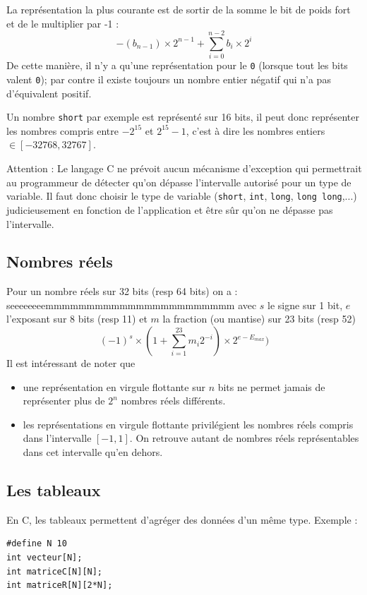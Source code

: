 La représentation la plus courante est de sortir de la somme le bit de poids fort et de le multiplier par -1 :
$$ -(b_{n-1}) \times 2^{n-1} +  \sum_{i=0}^{n-2} b_i \times 2^i$$
De cette manière, il n'y a qu'une représentation pour le \texttt{0} (lorsque tout les bits valent \texttt{0}); par contre il existe toujours un nombre entier négatif qui n'a pas d'équivalent positif.

Un nombre \texttt{short} par exemple est représenté sur 16 bits, il peut donc représenter les nombres compris entre $-2^{15}$ et $2^{15} - 1$, c'est à dire les nombres entiers $\in [-32768, 32767]$.


Attention : Le langage C ne prévoit aucun mécanisme d'exception qui permettrait au programmeur de détecter qu'on dépasse l'intervalle autorisé pour un type de variable.
Il faut donc choisir le type de variable (\texttt{short}, \texttt{int}, \texttt{long}, \texttt{long long},...) judicieusement en fonction de l'application et être sûr qu'on ne dépasse pas l'intervalle.

\subsection{Nombres réels}
Pour un nombre réels sur 32 bits (resp 64 bits) on a : seeeeeeeemmmmmmmmmmmmmmmmmmmmmmm avec $s$ le signe sur 1 bit, $e$ l'exposant sur 8 bits (resp 11) et $m$ la fraction (ou mantise) sur 23 bits (resp 52)
$$(-1)^s\times(1+\sum^23_{i=1} m_i 2^{-i})\times 2^{e-E_{max}})$$
Il est intéressant de noter que
\begin{itemize}
  \item une représentation en virgule flottante sur $n$ bits ne permet jamais de représenter plus de $2^n$ nombres réels différents.
  \item les représentations en virgule flottante privilégient les nombres réels compris dans l'intervalle $[-1,1]$.
    On retrouve autant de nombres réels représentables dans cet intervalle qu'en dehors.
\end{itemize}

\subsection{Les tableaux}
En C, les tableaux permettent d'agréger des données d'un même type.
Exemple :
\begin{lstlisting}
#define N 10
int vecteur[N];
int matriceC[N][N];
int matriceR[N][2*N];
\end{lstlisting}


